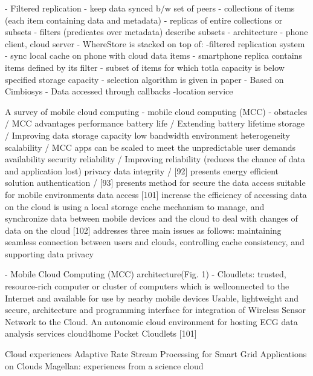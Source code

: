 				- Filtered replication
					- keep data synced b/w set of peers
						- collections of items (each item containing data and metadata)
						- replicas of entire collections or subsets
						- filters (predicates over metadata) describe subsets
				- architecture
					- phone client, cloud server
					- WhereStore is stacked on top of:
						-filtered replication system
							- sync local cache on phone with cloud data items
							- smartphone replica contains items defined by its filter
								- subset of items for which totla capacity is below specified storage capacity
								- selection algorithm is given in paper
							- Based on Cimbiosys
								- Data accessed through callbacks
						-location service
						
			A survey of mobile cloud computing
				- mobile cloud computing (MCC)
				- obstacles / MCC advantages
					performance 
						battery life / Extending battery lifetime
						storage / Improving data storage capacity
						low bandwidth
					environment
						heterogeneity
						scalability / MCC apps can be scaled to meet the unpredictable user demands
						availability
					security
						reliability / Improving reliability (reduces the chance of data and application lost)
						privacy
							data integrity / [92] presents energy efficient solution
							authentication / [93] presents method for secure the data access suitable for mobile environments
					data access
						[101] increase the efficiency of accessing data on the cloud is using a local storage
cache
							mechanism to manage, and synchronize data between mobile devices and the cloud to deal with changes
of data on the cloud
						[102] addresses three main issues as follows: maintaining seamless connection between users and
clouds, controlling cache consistency, and supporting data privacy

				- Mobile Cloud Computing (MCC) architecture(Fig. 1)
				- Cloudlets: trusted, resource-rich computer or cluster of computers which is wellconnected
to the Internet and available for use by nearby mobile devices
			Usable, lightweight and secure, architecture and programming interface for integration of Wireless Sensor Network to the Cloud.
			An autonomic cloud environment for hosting ECG data analysis services
			cloud4home
			Pocket Cloudlets [101]
			
	Cloud experiences
			Adaptive Rate Stream Processing for Smart Grid Applications on Clouds
			Magellan: experiences from a science cloud

		
			
